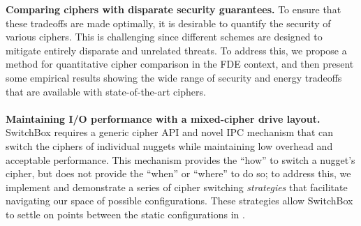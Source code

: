 \textbf{Comparing ciphers with disparate security guarantees.} To ensure that
these tradeoffs are made optimally, it is desirable to quantify the security of
various ciphers. This is challenging since different schemes are designed to
mitigate entirely disparate and unrelated threats. To address this, we propose a
method for quantitative cipher comparison in the FDE context, and then present
some empirical results showing the wide range of security and energy tradeoffs
that are available with state-of-the-art ciphers.
\\
\\
\textbf{Maintaining I/O performance with a mixed-cipher drive layout.} SwitchBox
requires a generic cipher API and novel IPC mechanism that can switch the
ciphers of individual nuggets while maintaining low overhead and acceptable
performance. This mechanism provides the ``how'' to switch a nugget's cipher,
but does not provide the ``when'' or ``where'' to do so; to address this, we
implement and demonstrate a series of cipher switching \textit{strategies} that
facilitate navigating our space of possible configurations. These strategies
allow SwitchBox to settle on points between the static configurations in
.
